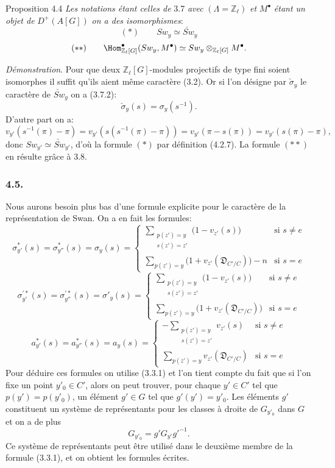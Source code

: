 \begin{statement}{Proposition 4.4}
\emph{Les notations étant celles de} 3.7 \emph{avec} $(\Lambda=\mathbb{Z}_\ell)$ \emph{et} $M^\bullet$ \emph{étant un objet de} $D^+(A[G])$ \emph{on a des isomorphismes}:
\[
(*)\qquad Sw_y\simeq \check{Sw}_y
\]
\[
(**)\qquad
\Hom^\bullet_{\mathbb{Z}_\ell[G]}(Sw_y,M^\bullet)
\simeq Sw_y\otimes_{\mathbb{Z}_\ell[G]}M^\bullet.
\]
\end{statement}

\emph{Démonstration}. Pour que deux $\mathbb{Z}_\ell[G]$-modules projectifs de type fini soient isomorphes il suffit qu'ils aient même caractère (3.2). Or si l'on désigne par $\check\sigma_y$ le caractère de $\check{Sw}_y$ on a (3.7.2):
\[
\check\sigma_y(s)=\sigma_y(s^{-1}).
\]
D'autre part on a:
\[
v_{y'}(s^{-1}(\pi)-\pi)
=v_{y'}(s(s^{-1}(\pi)-\pi))
=v_{y'}(\pi-s(\pi))
=v_{y'}(s(\pi)-\pi),
\]
donc $Sw_{y'}\simeq\check{Sw}_{y'}$, d'où la formule $(*)$ par définition (4.2.7). La formule $(**)$ en résulte grâce à 3.8.

\subsubsection*{4.5.}

Nous
aurons besoin plus bas d'une formule explicite pour le caractère de la représentation de Swan. On a en fait les formules:
\[
\sigma^{*}_{y'}(s)=\sigma^{*}_{y''}(s)=\sigma_y(s)=
\begin{cases}
\displaystyle\sum_{\substack{p(z')=y\\s(z')=z'}}\bigl(1-v_{z'}(s)\bigr)& \text{si } s\ne e\\[0.8em]
\displaystyle\sum_{p(z')=y}\bigl(1+v_{z'}(\mathfrak{D}_{C'/C})\bigr)-n& \text{si } s=e
\end{cases}
\tag{4.5.1}
\]
\[
\sigma^{\prime*}_{y'}(s)=\sigma^{\prime*}_{y''}(s)=\sigma'_y(s)=
\begin{cases}
\displaystyle\sum_{\substack{p(z')=y\\s(z')=z'}}\bigl(1-v_{z'}(s)\bigr)& \text{si } s\ne e\\[0.8em]
\displaystyle\sum_{p(z')=y}\bigl(1+v_{z'}(\mathfrak{D}_{C'/C})\bigr)& \text{si } s=e
\end{cases}
\tag{4.5.2}
\]
\[
a^{*}_{y'}(s)=a^{*}_{y''}(s)=a_y(s)=
\begin{cases}
\displaystyle-\sum_{\substack{p(z')=y\\s(z')=z'}}v_{z'}(s)& \text{si } s\ne e\\[0.8em]
\displaystyle\sum_{p(z')=y}v_{z'}(\mathfrak{D}_{C'/C})& \text{si } s=e
\end{cases}
\tag{4.5.3}
\]
Pour déduire ces formules on utilise (3.3.1) et l'on tient compte du fait que si l'on fixe un point $y'_0\in C'$, alors on peut trouver, pour chaque $y'\in C'$ tel que $p(y')=p(y'_0)$, un élément $g'\in G$ tel que $g'(y')=y'_0$. Les éléments $g'$ constituent un système de représentants pour les classes à droite de $G_{y'_0}$ dans $G$ et on a de plus
\[
G_{y'_0}=g'G_{y'}g'^{-1}.
\]
Ce système de représentants peut être utilisé dans le deuxième membre de la formule (3.3.1), et on obtient les formules écrites.

